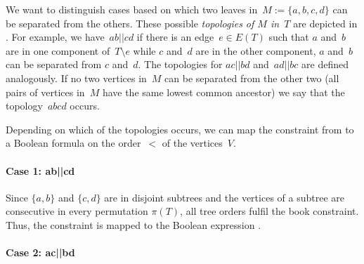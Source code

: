 
We want to distinguish cases based on which two leaves in~$M := \{a, b, c, d\}$ can be separated from the others. These possible \emph{topologies of $M$ in~$T$} are depicted in .
For example, we have~$ab||cd$ if there is an edge~$e \in E(T)$ such that $a$ and~$b$ are
in one component of~$T \setminus e$ while $c$ and~$d$ are in the other component, \ie
$a$ and~$b$ can be separated from $c$ and~$d$.
The topologies for $ac||bd$ and~$ad||bc$ are defined analogously. If no two vertices in~$M$ can be separated from the other
two (all pairs of vertices in~$M$ have the same lowest common ancestor) we say that the topology~$abcd$ occurs. 


Depending on which of the topologies occurs, we can map the constraint from  to a Boolean formula on the order~$<$ of the vertices~$V$.

\paragraph{Case 1: ab||cd}

Since $\{a, b\}$ and $\{c, d\}$ are in disjoint subtrees and the vertices of
a subtree are consecutive in every permutation $\pi(T)$, all tree orders
fulfil the book constraint. Thus, the constraint is mapped to the Boolean expression .

\paragraph{Case 2: ac||bd}

